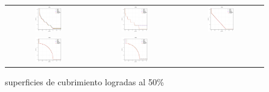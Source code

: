 \begin{figure}[H]
\caption{superficies de cubrimiento logradas al 50\%}%
\begin{tabular}{ccc}
  \includegraphics[width=0.33\textwidth]{Figures_Chapter7/Results_Chapter4/Surface_Representative/WFG1.eps}  &
  \includegraphics[width=0.33\textwidth]{Figures_Chapter7/Results_Chapter4/Surface_Representative/WFG2.eps} &
  \includegraphics[width=0.33\textwidth]{Figures_Chapter7/Results_Chapter4/Surface_Representative/WFG3.eps} \\
  \includegraphics[width=0.33\textwidth]{Figures_Chapter7/Results_Chapter4/Surface_Representative/WFG4.eps} &
  \includegraphics[width=0.33\textwidth]{Figures_Chapter7/Results_Chapter4/Surface_Representative/WFG5.eps} &

\end{tabular}
\end{figure}
